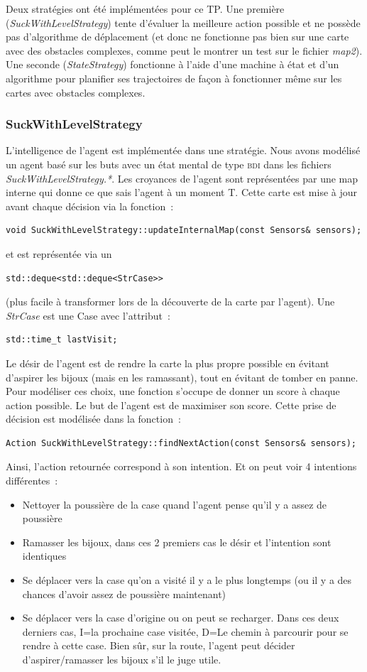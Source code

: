 \documentclass{article}
\begin{document}
Deux stratégies ont été implémentées pour ce TP. Une première
(\emph{SuckWithLevelStrategy}) tente d'évaluer la meilleure action possible et
ne possède pas d'algorithme de déplacement (et donc ne fonctionne pas bien sur
une carte avec des obstacles complexes, comme peut le montrer un test sur le
fichier \emph{map2}). Une seconde (\emph{StateStrategy}) fonctionne à l'aide
d'une machine à état et d'un algorithme pour planifier ses trajectoires de
façon à fonctionner même sur les cartes avec obstacles complexes.

\subsubsection{SuckWithLevelStrategy}

L'intelligence de l'agent est implémentée dans une stratégie. Nous avons modélisé un agent basé sur les buts avec un état mental de type \textsc{bdi} dans les fichiers \emph{SuckWithLevelStrategy.*}. Les croyances de l'agent sont représentées par une map interne qui donne ce que sais l'agent à un moment T. Cette carte est mise à jour avant chaque décision via la fonction~:
\begin{verbatim}
void SuckWithLevelStrategy::updateInternalMap(const Sensors& sensors);
\end{verbatim}
et est représentée via un \begin{verbatim}std::deque<std::deque<StrCase>>\end{verbatim} (plus facile à transformer lors de la découverte de la carte par l'agent). Une \emph{StrCase} est une Case avec l'attribut~:
\begin{verbatim}
std::time_t lastVisit;
\end{verbatim}

Le désir de l'agent est de rendre la carte la plus propre possible en évitant d'aspirer les bijoux (mais en les ramassant), tout en évitant de tomber en panne. Pour modéliser ces choix, une fonction s'occupe de donner un score à chaque action possible. Le but de l'agent est de maximiser son score. Cette prise de décision est modélisée dans la fonction~:
\begin{verbatim}
Action SuckWithLevelStrategy::findNextAction(const Sensors& sensors);
\end{verbatim}
Ainsi, l'action retournée correspond à son intention. Et on peut voir 4 intentions différentes~:
\begin{itemize}
    \item Nettoyer la poussière de la case quand l'agent pense qu'il y a assez de poussière
    \item Ramasser les bijoux, dans ces 2 premiers cas le désir et l'intention sont identiques
    \item Se déplacer vers la case qu'on a visité il y a le plus longtemps (ou il y a des chances d'avoir assez de poussière maintenant)
    \item Se déplacer vers la case d'origine ou on peut se recharger. Dans ces deux derniers cas, I=la prochaine case visitée, D=Le chemin à parcourir pour se rendre à cette case. Bien sûr, sur la route, l'agent peut décider d'aspirer/ramasser les bijoux s'il le juge utile.
\end{itemize}
\end{document}
